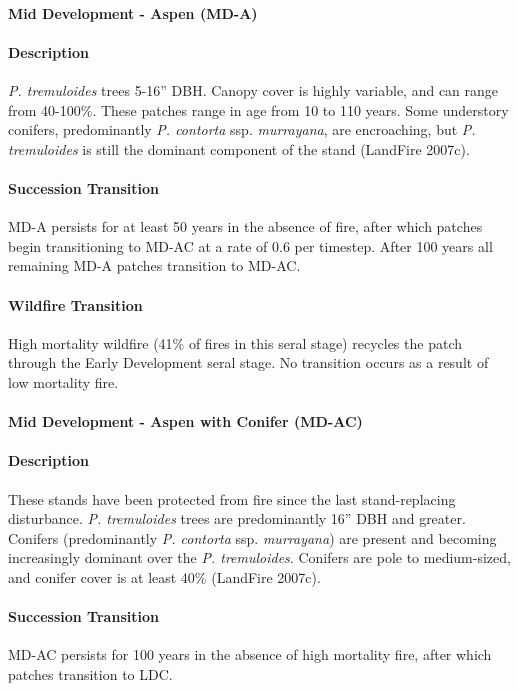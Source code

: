 \paragraph{Mid Development - Aspen (MD-A)}

\paragraph{Description} \emph{P. tremuloides} trees 5-16'' DBH. Canopy cover is highly variable, and can range from 40-100\%. These patches range in age from 10 to 110 years. Some understory conifers, predominantly \emph{P. contorta} ssp. \emph{murrayana}, are encroaching, but \emph{P. tremuloides} is still the dominant component of the stand (LandFire 2007c).

\paragraph{Succession Transition} MD-A persists for at least 50 years in the absence of fire, after which patches begin transitioning to MD-AC at a rate of 0.6 per timestep. After 100 years all remaining MD-A patches transition to MD-AC. 

\paragraph{Wildfire Transition} High mortality wildfire (41\% of fires in this seral stage) recycles the patch through the Early Development seral stage. No transition occurs as a result of low mortality fire.

\noindent\hrulefill

\paragraph{Mid Development - Aspen with Conifer (MD-AC)}

\paragraph{Description} These stands have been protected from fire since the last stand-replacing disturbance. \emph{P. tremuloides} trees are predominantly 16'' DBH and greater. Conifers (predominantly \emph{P. contorta} ssp. \emph{murrayana}) are present and becoming increasingly dominant over the \emph{P. tremuloides}. Conifers are pole to medium-sized, and conifer cover is at least 40\% (LandFire 2007c).

\paragraph{Succession Transition} MD-AC persists for 100 years in the absence of high mortality fire, after which patches transition to LDC. 

